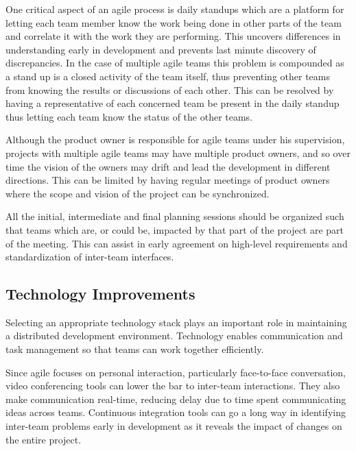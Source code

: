 One critical aspect of an agile process is daily standups which are a platform for letting each team member know the work being done in other parts of the team and correlate it with the work they are performing.
This uncovers differences in understanding early in development and prevents last minute discovery of discrepancies.
In the case of multiple agile teams this problem is compounded as a stand up is a closed activity of the team itself, thus preventing other teams from knowing the results or discussions of each other.
This can be resolved by having a representative of each concerned team be present in the daily standup thus letting each team know the status of the other teams.

Although the product owner is responsible for agile teams under his supervision, projects with multiple agile teams may have multiple product owners, and so over time the vision of the owners may drift and lead the development in different directions.
This can be limited by having regular meetings of product owners where the scope and vision of the project can be synchronized.

All the initial, intermediate and final planning sessions should be organized such that teams which are, or could be, impacted by that part of the project are part of the meeting.
This can assist in early agreement on high-level requirements and standardization of inter-team interfaces.

\subsection{Technology Improvements} \label{sec:tech_impv}
Selecting an appropriate technology stack plays an important role in maintaining a distributed development environment.
Technology enables communication and task management so that teams can work together efficiently.

Since agile focuses on personal interaction, particularly face-to-face conversation, video conferencing tools can lower the bar to inter-team interactions.
They also make communication real-time, reducing delay due to time spent communicating ideas across teams.
Continuous integration tools can go a long way in identifying inter-team problems early in development
as it reveals the impact of changes on the entire project.


